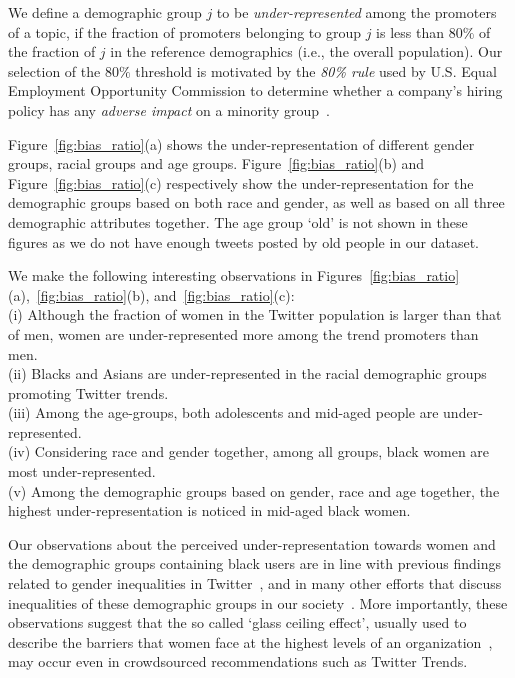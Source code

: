 \documentclass[letterpaper]{article}
\begin{document}
We define a demographic group $j$ to be {\it under-represented} among the promoters of
 a topic, if the fraction of promoters belonging to group $j$ is less than $80\%$ of the fraction of $j$ in the
reference demographics (i.e., the overall population). Our selection of the $80\%$ threshold is motivated
by the {\it 80\% rule} used by U.S. Equal Employment Opportunity Commission to determine
whether a company's hiring policy has any {\it adverse impact} on a minority group~\cite{biddle2006adverse}.

Figure~\ref{fig:bias_ratio}(a) shows the under-representation of different gender groups, racial groups and age groups.
Figure~\ref{fig:bias_ratio}(b) and Figure~\ref{fig:bias_ratio}(c) respectively show the under-representation for the demographic groups
based on both race and gender, as well as based on all three demographic attributes together.
The age group `old' is not shown in these figures as we do not have enough tweets posted by old people
in our dataset.

We make the following interesting observations in Figures~\ref{fig:bias_ratio}(a),~\ref{fig:bias_ratio}(b),
and~\ref{fig:bias_ratio}(c): \\
(i) Although the fraction of women in the Twitter population is larger than that of men, women are
under-represented more among the trend promoters than men. \\
(ii) Blacks and Asians are under-represented in the racial demographic groups promoting Twitter trends.\\
(iii) Among the age-groups, both adolescents and mid-aged people are under-represented.\\
(iv) Considering race and gender together,
among all groups, black women are most under-represented. \\
(v) Among the demographic groups based on gender, race and age together,
the highest under-representation is noticed in mid-aged black women.

Our observations about the perceived under-representation towards women and
the demographic groups containing black users are in line with previous findings related to
gender inequalities in Twitter~\cite{nilizadeh2016twitter}, and in many other efforts that discuss
inequalities of these demographic groups in our society~\cite{cotter2001glass,bonilla2006racism}.
More importantly, these observations suggest that the so called
`glass ceiling effect', usually used to describe the barriers that women face at the highest levels of
an organization~\cite{cotter2001glass}, may occur even in crowdsourced recommendations such as Twitter Trends.
\end{document}
